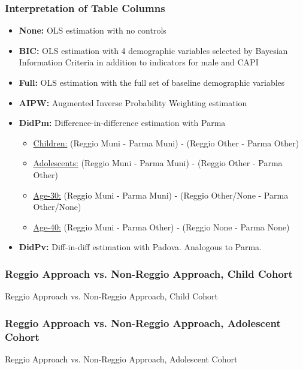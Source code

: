 \documentclass[static]{JJH-Beamer_PAGENOS}
\begin{document}
\begin{frame}
\frametitle{Interpretation of Table Columns}
\begin{footnotesize}
\begin{itemize}
	\item \textbf{None:} OLS estimation with no controls
	\item \textbf{BIC:} OLS estimation with 4 demographic variables selected by Bayesian Information Criteria in addition to indicators for male and CAPI	
	\item \textbf{Full:} OLS estimation with the full set of baseline demographic variables 
	\item \textbf{AIPW:} Augmented Inverse Probability Weighting estimation 
	\item \textbf{DidPm:} Difference-in-difference estimation with Parma
		\begin{itemize}
		\item \underline{Children:} (Reggio Muni - Parma Muni) - (Reggio Other - Parma Other)
		\item \underline{Adolescents:} (Reggio Muni - Parma Muni) - (Reggio Other - Parma Other) 
		\item \underline{Age-30:} (Reggio Muni - Parma Muni) - (Reggio Other/None - Parma Other/None)
		\item \underline{Age-40:} (Reggio Muni - Parma Other) - (Reggio None - Parma None)
		\end{itemize}
	\item \textbf{DidPv:} Diff-in-diff estimation with Padova. Analogous to Parma.
\end{itemize}
\end{footnotesize}
\end{frame}


\begin{frame}
\frametitle{Reggio Approach vs. Non-Reggio Approach, Child Cohort}
\centering
\begin{table}[H]
\caption{Reggio Approach vs. Non-Reggio Approach, Child Cohort}
\end{table}
\end{frame}

\begin{frame}
\frametitle{Reggio Approach vs. Non-Reggio Approach, Adolescent Cohort}
\centering
\begin{table}[H]
\caption{Reggio Approach vs. Non-Reggio Approach, Adolescent Cohort}
\end{table}
\end{frame}
\end{document}
